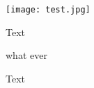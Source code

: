 \restoregeometry
\texttt{[image: test.jpg]}\clearpage


\newpage

Text

\begin{tcolorbox}
what ever
\end{tcolorbox}

Text


\newpage
